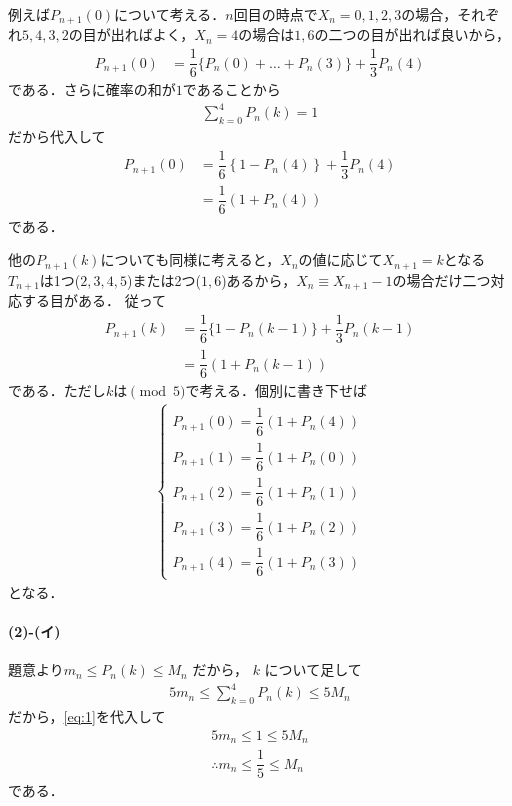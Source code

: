 \documentclass[../../main.tex]{subfiles}
\begin{document}
例えば$P_{n+1}(0)$について考える．$n$回目の時点で$X_n=0,1,2,3$の場合，それぞれ$5,4,3,2$の目が出ればよく，$X_n=4$の場合は$1,6$の二つの目が出れば良いから，
\begin{align}
  P_{n+1}(0) &= \dfrac{1}{6} \{ P_n(0) + \dots + P_n(3) \} + \dfrac{1}{3} P_n(4)
\end{align}
である．さらに確率の和が$1$であることから
\begin{align}
  \sum_{k=0}^{4}P_n(k) = 1 \label{eq:1}
\end{align}
だから代入して
\begin{align}
  P_{n+1}(0)
  &= \dfrac{1}{6}\left\{1-P_n(4)\right\} + \dfrac{1}{3} P_n(4) \\
  &= \dfrac{1}{6}(1 + P_n(4)) \label{eq:2}
\end{align}
である．

他の$P_{n+1}(k)$についても同様に考えると，$X_{n}$の値に応じて$X_{n+1}=k$となる$T_{n+1}$は1つ($2,3,4,5$)または2つ($1,6$)あるから，$X_n\equiv X_{n+1}-1$の場合だけ二つ対応する目がある．
従って
\begin{align}
  P_{n+1}(k) &= \dfrac{1}{6} \{ 1-P_{n}(k-1) \} + \dfrac{1}{3}P_{n}(k-1) \\
  &= \dfrac{1}{6}\left(1 + P_{n}(k-1)\right) \label{eq:3}
\end{align}
である．ただし$k$は$\pmod 5$で考える．個別に書き下せば
\begin{align}
  \begin{cases}
    P_{n+1}(0)  = \dfrac{1}{6}(1 + P_n(4)) \\
    P_{n+1}(1)  = \dfrac{1}{6}(1 + P_n(0)) \\
    P_{n+1}(2)  = \dfrac{1}{6}(1 + P_n(1)) \\
    P_{n+1}(3)  = \dfrac{1}{6}(1 + P_n(2)) \\
    P_{n+1}(4)  = \dfrac{1}{6}(1 + P_n(3))
  \end{cases} \label{eq:4}
\end{align}
となる．

\paragraph{(2)-(イ)}

題意より$m_n \le P_n(k) \le M_n$ だから， $k$ について足して
\begin{align}
  5m_n \le \sum_{k=0}^{4}P_n(k) \le 5M_n
\end{align}
だから，\cref{eq:1}を代入して
\begin{align}
  5m_n \le 1 \le 5M_n \\
  \therefore
  m_n \le \dfrac{1}{5} \le M_n \label{eq:5}
\end{align}
である．
\end{document}
